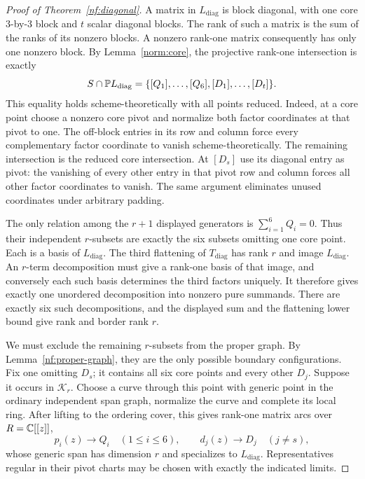\begin{proof}[Proof of Theorem~\ref{nf:diagonal}]
A matrix in $L_{\mathrm{diag}}$ is block diagonal, with one core
$3$-by-$3$ block and $t$ scalar diagonal blocks. The rank of such a
matrix is the sum of the ranks of its nonzero blocks. A nonzero
rank-one matrix consequently has only one nonzero block. By
Lemma~\ref{norm:core}, the projective rank-one intersection is
exactly
\begin{equation}\label{nf:diagonal-intersection}
 S\cap\mathbb P L_{\mathrm{diag}}
 =\{[Q_1],\ldots,[Q_6],[D_1],\ldots,[D_t]\}.
\end{equation}
This equality holds scheme-theoretically with all points reduced.
Indeed, at a core point choose a nonzero core pivot and normalize both
factor coordinates at that pivot to one. The off-block entries in
its row and column force every complementary factor coordinate to
vanish scheme-theoretically. The remaining intersection is the
reduced core intersection. At $[D_s]$ use its diagonal entry as pivot:
the vanishing of every other entry in that pivot row and column forces
all other factor coordinates to vanish. The same argument eliminates
unused coordinates under arbitrary padding.

The only relation among the $r+1$ displayed generators is
$\sum_{i=1}^6Q_i=0$. Thus their independent $r$-subsets are exactly
the six subsets omitting one core point. Each is a basis of
$L_{\mathrm{diag}}$. The third flattening of $T_{\mathrm{diag}}$
has rank $r$ and image $L_{\mathrm{diag}}$. An $r$-term
decomposition must give a rank-one basis of that image, and conversely
each such basis determines the third factors uniquely. It therefore
gives exactly one unordered decomposition into nonzero pure summands.
There are exactly six such decompositions, and the displayed sum and
the flattening lower bound give rank and border rank $r$.

We must exclude the remaining $r$-subsets from the proper graph.
By Lemma~\ref{nf:proper-graph}, they are the only possible boundary
configurations. Fix one omitting $D_s$; it contains all six core
points and every other $D_j$. Suppose it occurs in $\mathcal K_r$.
Choose a curve through this point with generic point in the ordinary
independent span graph, normalize the curve and complete its local
ring. After lifting to the ordering cover, this gives rank-one matrix
arcs over $R=\mathbb C[[z]]$,
\[
 p_i(z)\longrightarrow Q_i\quad(1\leq i\leq6),\qquad
 d_j(z)\longrightarrow D_j\quad(j\ne s),
\]
whose generic span has dimension $r$ and specializes to
$L_{\mathrm{diag}}$. Representatives regular in their pivot charts
may be chosen with exactly the indicated limits.


\end{proof}
